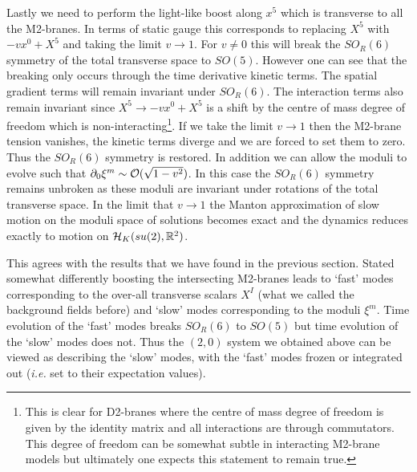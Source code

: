 \documentclass[12pt]{article}
\numberwithin{equation}{section}
\begin{document}
Lastly we need to perform the light-like boost along $x^5$ which is transverse to all the M2-branes. In terms of static gauge this corresponds to replacing $X^5$ with $-vx^0+ X^5$ and taking the limit $v\to 1$. For  $v \ne 0$ this will break the $SO_R(6)$ symmetry of the total transverse space to $SO(5)$. However one can see that  the breaking only occurs through the time derivative kinetic terms. The spatial gradient terms will remain invariant under $SO_R(6)$. The interaction terms also remain  invariant since $X^5\to -vx^0+X^5$ is  a shift by the centre of mass degree of freedom which is non-interacting\footnote{This is clear for D2-branes where the centre of mass degree of freedom is given by the identity matrix and all interactions are through commutators. This degree of freedom can be somewhat subtle in interacting M2-brane models but ultimately one expects this statement to remain true.}. If we take the limit $v\to 1$ then 
the M2-brane tension vanishes, the kinetic terms diverge and we are forced to set them to zero. Thus the $SO_R(6)$ symmetry is restored. In addition  we can allow the moduli to evolve such that $\partial_0\xi^m \sim {\cal O}(\sqrt{1-v^2})$. In this case the $SO_R(6)$ symmetry remains unbroken  as these moduli are invariant under rotations of the total transverse space. In the limit that $v\to 1$ the Manton approximation of slow motion on the moduli space of solutions becomes exact  and the dynamics reduces exactly to motion on ${\cal H}_K(su(2),{\mathbb R}^2)$.  

This agrees with the results that we have found in the previous section. Stated somewhat differently boosting the intersecting M2-branes leads to `fast' modes corresponding to the over-all transverse scalars $X^I$ (what we called the background fields before) and `slow' modes corresponding to the moduli $\xi^m$. Time evolution of the `fast' modes breaks   $SO_R(6)$ to $SO(5)$  but time evolution of the `slow' modes does not. Thus the   $(2,0)$ system we obtained above can be viewed as describing the `slow' modes,  with the `fast' modes   frozen or integrated out ({\it i.e.} set to their expectation values).  

\end{document}
